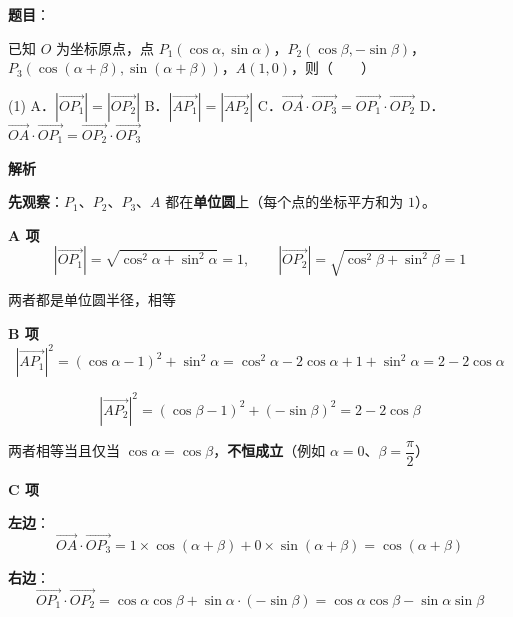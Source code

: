 \begin{answer}

\textbf{题目}：

已知 $O$ 为坐标原点，点 $P_1(\cos\alpha,\sin\alpha)$，$P_2(\cos\beta,-\sin\beta)$，$P_3(\cos(\alpha+\beta),\sin(\alpha+\beta))$，$A(1,0)$，则\mbox{（　　）}

\begin{gkopts}(1)
\task A．$\left|\overrightarrow{OP_1}\right|=\left|\overrightarrow{OP_2}\right|$
\task B．$\left|\overrightarrow{AP_1}\right|=\left|\overrightarrow{AP_2}\right|$
\task C．$\overrightarrow{OA}\cdot\overrightarrow{OP_3}=\overrightarrow{OP_1}\cdot\overrightarrow{OP_2}$
\task D．$\overrightarrow{OA}\cdot\overrightarrow{OP_1}=\overrightarrow{OP_2}\cdot\overrightarrow{OP_3}$
\end{gkopts}

\textbf{解析}

\textbf{先观察}：$P_1$、$P_2$、$P_3$、$A$ 都在\textbf{单位圆}上（每个点的坐标平方和为 $1$）。

\par\medskip

\textbf{A 项 }
\nopagebreak[4]
\[\left|\overrightarrow{OP_1}\right|=\sqrt{\cos^{2}\alpha+\sin^{2}\alpha}=1,\qquad \left|\overrightarrow{OP_2}\right|=\sqrt{\cos^{2}\beta+\sin^{2}\beta}=1\]

两者都是单位圆半径，相等 

\par\medskip

\textbf{B 项 }
\nopagebreak[4]
\[\left|\overrightarrow{AP_1}\right|^{2}=(\cos\alpha-1)^{2}+\sin^{2}\alpha=\cos^{2}\alpha-2\cos\alpha+1+\sin^{2}\alpha=2-2\cos\alpha\]

\nopagebreak[4]
\[\left|\overrightarrow{AP_2}\right|^{2}=(\cos\beta-1)^{2}+(-\sin\beta)^{2}=2-2\cos\beta\]

两者相等当且仅当 $\cos\alpha=\cos\beta$，\textbf{不恒成立}（例如 $\alpha=0$、$\beta=\dfrac\pi2$）

\par\medskip

\textbf{C 项 }

\textbf{左边}：
\nopagebreak[4]
\[\overrightarrow{OA}\cdot\overrightarrow{OP_3}=1\times\cos(\alpha+\beta)+0\times\sin(\alpha+\beta)=\cos(\alpha+\beta)\]

\textbf{右边}：
\nopagebreak[4]
\[\overrightarrow{OP_1}\cdot\overrightarrow{OP_2}=\cos\alpha\cos\beta+\sin\alpha\cdot(-\sin\beta)=\cos\alpha\cos\beta-\sin\alpha\sin\beta\]


\end{answer}
